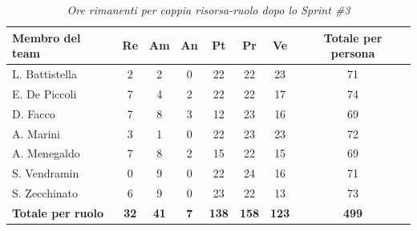 \documentclass[a4paper, 10pt, colorlinks=true, linkcolor=black, urlcolor=blue, citecolor=blue, hidelinks]{article}
\renewcommand{\arraystretch}{1.2}
\begin{document}
\begin{table}[H]
    \centering
    \renewcommand{\arraystretch}{1.4}
    \begin{tabular}{|l|c|c|c|c|c|c|c|}
        \hline
        \rowcolor{bluBitless!15}
        \textbf{Membro del team} & \textbf{Re} & \textbf{Am} & \textbf{An} & \textbf{Pt} & \textbf{Pr} & \textbf{Ve} & \textbf{Totale per persona} \\
        \hline
        L. Battistella & 2 & 2 & 0 & 22 & 22 & 23 & 71 \\ \hline
        E. De Piccoli & 7 & 4 & 2 & 22 & 22 & 17 & 74 \\ \hline
        D. Facco & 7 & 8 & 3 & 12 & 23 & 16 & 69 \\ \hline
        A. Marini & 3 & 1 & 0 & 22 & 23 & 23 & 72 \\ \hline
        A. Menegaldo & 7 & 8 & 2 & 15 & 22 & 15 & 69 \\ \hline
        S. Vendramin & 0 & 9 & 0 & 22 & 24 & 16 & 71 \\ \hline
        S. Zecchinato & 6 & 9 & 0 & 23 & 22 & 13 & 73 \\ \hline
        \rowcolor{bluBitless!8}
        \textbf{Totale per ruolo} & \textbf{32} & \textbf{41} & \textbf{7} & \textbf{138} & \textbf{158} & \textbf{123} & \textbf{499} \\
        \hline
    \end{tabular}
    \caption{\textit{Ore rimanenti per coppia risorsa-ruolo dopo lo Sprint \#3}}
\end{table}
\end{document}
